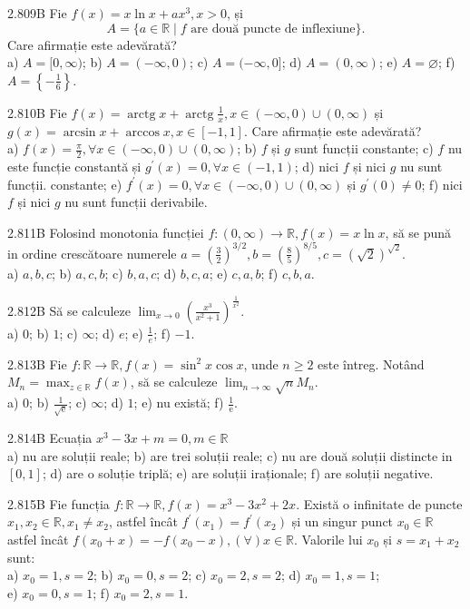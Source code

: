 \documentclass[11pt]{article}
\begin{document}
2.809B Fie $f(x)=x \ln x+a x^{3}, x>0$, și $$A=\{a \in \mathbb{R} \mid f \text { are două puncte de inflexiune}\}.$$
Care afirmație este adevărată?\\
a) $A=[0, \infty)$; b) $A=(-\infty, 0)$; c) $A=(-\infty, 0]$; d) $A=(0, \infty)$; e) $A=\varnothing$; f) $A=\left\{-\frac{1}{6}\right\}$.

2.810B Fie $f(x)=\operatorname{arctg} x+\operatorname{arctg} \frac{1}{x}, x \in(-\infty, 0) \cup(0, \infty)$ și $g(x)=\arcsin x+\arccos x, x \in[-1,1]$. Care afirmație este adevărată?\\ a) $f(x)=\frac{\pi}{2}, \forall x \in(-\infty, 0) \cup(0, \infty)$; b) $f$ și $g$ sunt funcții constante; c) $f$ nu este funcție constantă și $g^{\prime}(x)=0, \forall x \in(-1,1)$; d) nici $f$ și nici $g$ nu sunt funcții. constante; e) $f^{\prime}(x)=0, \forall x \in(-\infty, 0) \cup(0, \infty)$ și $g^{\prime}(0) \neq 0$; f) nici $f$ și nici $g$ nu sunt funcții derivabile.

2.811B Folosind monotonia funcției $f:(0, \infty) \rightarrow \mathbb{R}, f(x)=x \ln x$, să se pună in ordine crescătoare numerele $a=\left(\frac{3}{2}\right)^{3 / 2}, b=\left(\frac{8}{5}\right)^{8 / 5}, c=(\sqrt{2})^{\sqrt{2}}$.\\ a) $a, b, c$; b) $a, c, b$; c) $b, a, c$; d) $b, c, a$; e) $c, a, b$; f) $c, b, a$.

2.812B Să se calculeze $\lim _{x \rightarrow 0}\left(\frac{x^{3}}{x^{2}+1}\right)^{\frac{1}{x^{2}}}$.\\ a) $0$; b) $1$; c) $\infty$; d) $e$; e) $\frac{1}{e}$; f) $-1$.

2.813B Fie $f: \mathbb{R} \rightarrow \mathbb{R}, f(x)=\sin ^{2} x \cos x$, unde $n \geq 2$ este întreg. Notând $M_{n}=\max _{z \in \mathbb{R}} f(x)$, să se calculeze $\lim _{n \rightarrow \infty} \sqrt{n} M_{n}$.\\ a) $0$; b) $\frac{1}{\sqrt{\mathrm{e}}}$; c) $\infty$; d) $1$; e) nu există; f) $\frac{1}{\mathrm{e}}$.

2.814B Ecuația $x^{3}-3 x+m=0, m \in \mathbb{R}$\\ a) nu are soluții reale; b) are trei soluții reale; c) nu are două soluții distincte in $[0,1]$; d) are o soluție triplă; e) are soluții iraționale; f) are soluții negative.

2.815B Fie funcția $f: \mathbb{R} \rightarrow \mathbb{R}, f(x)=x^{3}-3 x^{2}+2 x$. Există o infinitate de puncte $x_{1}, x_{2} \in \mathbb{R}, x_{1} \neq x_{2}$, astfel încât $f^{\prime}\left(x_{1}\right)=f^{\prime}\left(x_{2}\right)$ și un singur punct $x_{0} \in \mathbb{R}$ astfel încât $f\left(x_{0}+x\right)=-f\left(x_{0}-x\right),(\forall) x \in \mathbb{R}$. Valorile lui $x_{0}$ și $s=x_{1}+x_{2}$ sunt:\\ a) $x_{0}=1, s=2$; b) $x_{0}=0, s=2$; c) $x_{0}=2, s=2$; d) $x_{0}=1, s=1$;\\ e) $x_{0}=0, s=1$; f) $x_{0}=2, s=1$.
\end{document}
